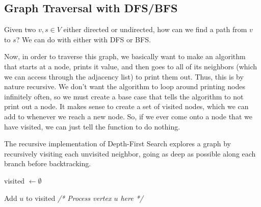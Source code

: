   \begin{algo}
    
  \end{algo}

  \begin{algo}
    
  \end{algo} 

\subsection{Graph Traversal with DFS/BFS}

  Given two $v, s \in V$ either directed or undirected, how can we find a path from $v$ to $s$? We can do with either with DFS or BFS. 

  Now, in order to traverse this graph, we basically want to make an algorithm that starts at a node, prints it value, and then goes to all of its neighbors (which we can access through the adjacency list) to print them out. Thus, this is by nature recursive. We don't want the algorithm to loop around printing nodes infinitely often, so we must create a base case that tells the algorithm to not print out a node. It makes sense to create a set of visited nodes, which we can add to whenever we reach a new node. So, if we ever come onto a node that we have visited, we can just tell the function to do nothing. 

  \begin{algo}
    The recursive implementation of Depth-First Search explores a graph by recursively visiting each unvisited neighbor, going as deep as possible along each branch before backtracking.
    \begin{algorithm}[H]
      \label{alg:dfs_recursive}
      \begin{algorithmic}[1]
        
          \State visited $\gets \emptyset$ 
          \State {}
        \EndFunction
        
          \State Add $u$ to visited
          \State \textit{/* Process vertex $u$ here */}
              \State {}
            \EndIf
          \EndFor
        \EndFunction
      \end{algorithmic}
    \end{algorithm}
  \end{algo}

